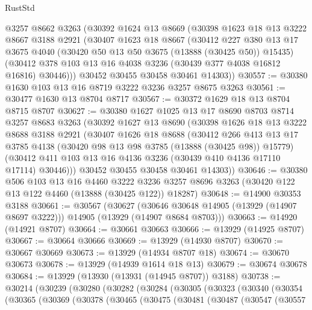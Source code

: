 \begin{lexlean}{RustStd}
\begin{coremodule}
    @3257
    @8662
    @3263
    (@30392
      @1624
      @13
      @8669
      (@30398
        @1623
        @18
        @13
        @3222
        @8667
        @3188
        @2921
        (@30407
          @1623
          @18
          @8667
          (@30412
            @227
            @380
            @13
            @17
            @3675
            @4040
            (@30420 @50 @13 @50 @3675 (@13888 (@30425 @50)) @15435)
            (@30412 @378 @103 @13 @16 @4038 @3236 (@30439 @377 @4038 @16812 @16816) @30446)))
        @30452
        @30455
        @30458
        @30461
        @14303))
@30557 := @30380 @1630 @103 @13 @16 @8719 @3222 @3236 @3257 @8675 @3263
@30561 := @30477 @1630 @13 @8704 @8717
@30567 := @30372 @1629 @18 @13 @8704 @8715 @8707
@30627 := @30380
    @1627
    @1025
    @13
    @17
    @8690
    @8703
    @8714
    @3257
    @8683
    @3263
    (@30392
      @1627
      @13
      @8690
      (@30398
        @1626
        @18
        @13
        @3222
        @8688
        @3188
        @2921
        (@30407
          @1626
          @18
          @8688
          (@30412
            @266
            @413
            @13
            @17
            @3785
            @4138
            (@30420 @98 @13 @98 @3785 (@13888 (@30425 @98)) @15779)
            (@30412 @411 @103 @13 @16 @4136 @3236 (@30439 @410 @4136 @17110 @17114) @30446)))
        @30452
        @30455
        @30458
        @30461
        @14303))
@30646 := @30380
    @506
    @103
    @13
    @16
    @4460
    @3222
    @3236
    @3257
    @8696
    @3263
    (@30420 @122 @13 @122 @4460 (@13888 (@30425 @122)) @18287)
@30648 := @14900 @30353 @3188
@30661 := @30567
    (@30627
      (@30646 @30648 @14905 (@13929 (@14907 @8697 @3222)))
      @14905
      (@13929 (@14907 @8684 @8703)))
@30663 := @14920 (@14921 @8707)
@30664 := @30661 @30663
@30666 := @13929 (@14925 @8707)
@30667 := @30664 @30666
@30669 := @13929 (@14930 @8707)
@30670 := @30667 @30669
@30673 := @13929 (@14934 @8707 @18)
@30674 := @30670 @30673
@30678 := @13929 (@14939 @1614 @18 @13)
@30679 := @30674 @30678
@30684 := @13929 (@13930 (@13931 (@14945 @8707)) @3188)
@30738 := @30214
    (@30239
      (@30280
        (@30282
          (@30284
            (@30305
              (@30323
                (@30340
                  (@30354
                    (@30365
                      (@30369
                        (@30378
                          (@30465
                            (@30475
                              (@30481
                                (@30487
                                  (@30547
                                    (@30557

\end{coremodule}
\end{lexlean}
